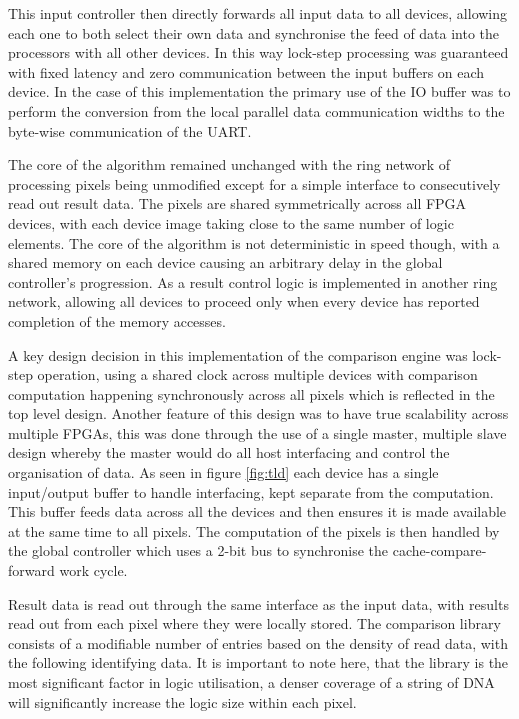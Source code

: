 \documentclass[conference]{IEEEtran}
\begin{document}
This input controller then directly forwards all input data to all devices, allowing each one to both select their own data and synchronise the feed of data into the processors with all other devices. In this way lock-step processing was guaranteed with fixed latency and zero communication between the input buffers on each device. In the case of this implementation the primary use of the IO buffer was to perform the conversion from the local parallel data communication widths to the byte-wise communication of the UART. 

The core of the algorithm remained unchanged with the ring network of processing pixels being unmodified except for a simple interface to consecutively read out result data. The pixels are shared symmetrically across all FPGA devices, with each device image taking close to the same number of logic elements. The core of the algorithm is not deterministic in speed though, with a shared memory on each device causing an arbitrary delay in the global controller's progression. As a result control logic is implemented in another ring network, allowing all devices to proceed only when every device has reported completion of the memory accesses.



A key design decision in this implementation of the comparison engine was lock-step operation, using a shared clock across multiple devices with comparison computation happening synchronously across all pixels which is reflected in the top level design. Another feature of this design was to have true scalability across multiple FPGAs, this was done through the use of a single master, multiple slave design whereby the master would do all host interfacing and control the organisation of data. As seen in figure \ref{fig:tld} each device has a single input/output buffer to handle interfacing, kept separate from the computation. This buffer feeds data across all the devices and then ensures it is made available at the same time to all pixels. The computation of the pixels is then handled by the global controller which uses a 2-bit bus to synchronise the cache-compare-forward work cycle. 

Result data is read out through the same interface as the input data, with results read out from each pixel where they were locally stored. The comparison library consists of a modifiable number of entries based on the density of read data, with the following identifying data. It is important to note here, that the library is the most significant factor in logic utilisation, a denser coverage of a string of DNA will significantly increase the logic size within each pixel. 
\end{document}
